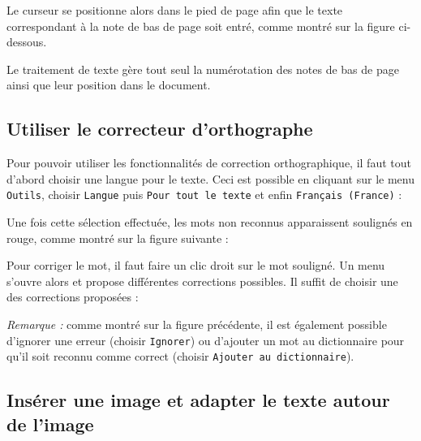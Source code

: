 
Le curseur se positionne alors dans le pied de page afin que le texte correspondant à la note de bas de page soit entré, comme montré sur la figure ci-dessous.


Le traitement de texte gère tout seul la numérotation des notes de bas de page ainsi que leur position dans le document.




\subsection{Utiliser le correcteur d'orthographe}\label{Texte2CorrecteurOrtho}

Pour pouvoir utiliser les fonctionnalités de correction orthographique, il faut tout d'abord choisir une langue pour le texte. Ceci est possible en cliquant sur le menu \texttt{Outils}, choisir \texttt{Langue} puis \texttt{Pour tout le texte} et enfin \texttt{Français (France)} :


Une fois cette sélection effectuée, les mots non reconnus apparaissent soulignés en rouge, comme montré sur la figure suivante :


Pour corriger le mot, il faut faire un clic droit sur le mot souligné. Un menu s'ouvre alors et propose différentes corrections possibles. Il suffit de choisir une des corrections proposées :


\emph{Remarque :} comme montré sur la figure précédente, il est également possible d'ignorer une erreur (choisir \texttt{Ignorer}) ou d'ajouter un mot au dictionnaire pour qu'il soit reconnu comme correct (choisir \texttt{Ajouter au dictionnaire}).    




\subsection{Insérer une image et adapter le texte autour de l'image}\label{Texte2InsererImage}

